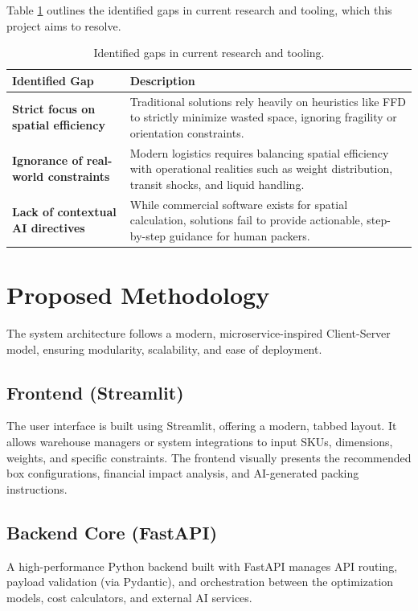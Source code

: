 \documentclass[12pt,a4paper]{article}
\begin{document}
Table \ref{tab:gaps} outlines the identified gaps in current research and tooling, which this project aims to resolve.

\begin{table}[H]
\centering
\begin{tabularx}{\textwidth}{@{} l X @{}}
\toprule
\textbf{Identified Gap} & \textbf{Description} \\
\midrule
\textbf{Strict focus on spatial efficiency} & Traditional solutions rely heavily on heuristics like FFD to strictly minimize wasted space, ignoring fragility or orientation constraints. \\
\addlinespace
\textbf{Ignorance of real-world constraints} & Modern logistics requires balancing spatial efficiency with operational realities such as weight distribution, transit shocks, and liquid handling. \\
\addlinespace
\textbf{Lack of contextual AI directives} & While commercial software exists for spatial calculation, solutions fail to provide actionable, step-by-step guidance for human packers. \\
\bottomrule
\end{tabularx}
\caption{Identified gaps in current research and tooling.}
\label{tab:gaps}
\end{table}

\section{Proposed Methodology}
The system architecture follows a modern, microservice-inspired Client-Server model, ensuring modularity, scalability, and ease of deployment.

\subsection{Frontend (Streamlit)}
The user interface is built using Streamlit, offering a modern, tabbed layout. It allows warehouse managers or system integrations to input SKUs, dimensions, weights, and specific constraints. The frontend visually presents the recommended box configurations, financial impact analysis, and AI-generated packing instructions.

\subsection{Backend Core (FastAPI)}
A high-performance Python backend built with FastAPI manages API routing, payload validation (via Pydantic), and orchestration between the optimization models, cost calculators, and external AI services.
\end{document}
